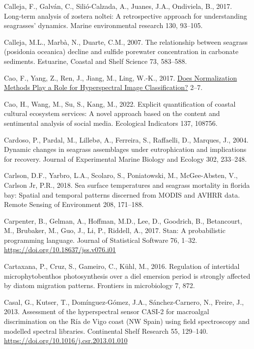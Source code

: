 \documentclass[
  letterpaper,
  11pt,
  english,
  singlespacing,
  headsepline]{MastersDoctoralThesis}
\newlength{\cslhangindent}
\newenvironment{CSLReferences}[2] %
 {\begin{list}{}{%
  \setlength{\itemindent}{0pt}
  \setlength{\leftmargin}{0pt}
  \setlength{\parsep}{0pt}
  \ifodd #1
   \setlength{\leftmargin}{\cslhangindent}
   \setlength{\itemindent}{-1\cslhangindent}
  \fi
  \setlength{\itemsep}{#2\baselineskip}}}
 {\end{list}}
\begin{document}
\begin{CSLReferences}{1}{0}
Calleja, F., Galván, C., Silió-Calzada, A., Juanes, J.A., Ondiviela, B.,
2017. Long-term analysis of zostera noltei: A retrospective approach for
understanding seagrasses' dynamics. Marine environmental research 130,
93--105.

Calleja, M.L., Marbà, N., Duarte, C.M., 2007. The relationship between
seagrass (posidonia oceanica) decline and sulfide porewater
concentration in carbonate sediments. Estuarine, Coastal and Shelf
Science 73, 583--588.

Cao, F., Yang, Z., Ren, J., Jiang, M., Ling, W.-K., 2017.
\href{http://arxiv.org/abs/1710.02939}{{Does Normalization Methods Play
a Role for Hyperspectral Image Classification?}} 2--7.

Cao, H., Wang, M., Su, S., Kang, M., 2022. Explicit quantification of
coastal cultural ecosystem services: A novel approach based on the
content and sentimental analysis of social media. Ecological Indicators
137, 108756.

Cardoso, P., Pardal, M., Lillebø, A., Ferreira, S., Raffaelli, D.,
Marques, J., 2004. Dynamic changes in seagrass assemblages under
eutrophication and implications for recovery. Journal of Experimental
Marine Biology and Ecology 302, 233--248.

Carlson, D.F., Yarbro, L.A., Scolaro, S., Poniatowski, M., McGee-Absten,
V., Carlson Jr, P.R., 2018. Sea surface temperatures and seagrass
mortality in florida bay: Spatial and temporal patterns discerned from
MODIS and AVHRR data. Remote Sensing of Environment 208, 171--188.

Carpenter, B., Gelman, A., Hoffman, M.D., Lee, D., Goodrich, B.,
Betancourt, M., Brubaker, M., Guo, J., Li, P., Riddell, A., 2017. Stan:
A probabilistic programming language. Journal of Statistical Software
76, 1--32. \url{https://doi.org/10.18637/jss.v076.i01}

Cartaxana, P., Cruz, S., Gameiro, C., Kühl, M., 2016. Regulation of
intertidal microphytobenthos photosynthesis over a diel emersion period
is strongly affected by diatom migration patterns. Frontiers in
microbiology 7, 872.

Casal, G., Kutser, T., Domínguez-Gómez, J.A., Sánchez-Carnero, N.,
Freire, J., 2013. {Assessment of the hyperspectral sensor CASI-2 for
macroalgal discrimination on the R{í}a de Vigo coast (NW Spain) using
field spectroscopy and modelled spectral libraries}. Continental Shelf
Research 55, 129--140. \url{https://doi.org/10.1016/j.csr.2013.01.010}


\end{CSLReferences}
\end{document}
